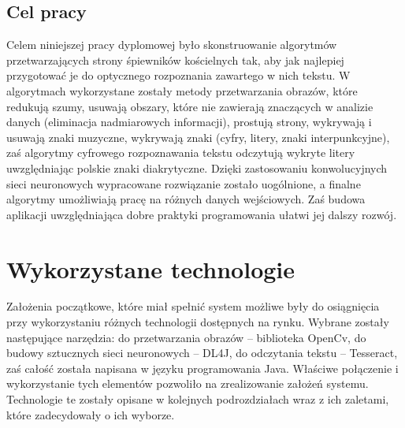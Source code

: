 \documentclass[a4paper,12pt]{article}
\newcommand\spacingIndent{2.2em}
\begin{document}
\begin{minipage}[s]{\textwidth}
		\subsection{Cel pracy}
			\hspace{\spacingIndent} Celem niniejszej pracy dyplomowej było skonstruowanie algorytmów przetwarzających strony śpiewników kościelnych tak, 
				aby jak najlepiej przygotować je do optycznego rozpoznania zawartego w nich tekstu. W algorytmach wykorzystane zostały metody przetwarzania obrazów, 
				które redukują szumy, usuwają obszary, które nie zawierają znaczących w analizie danych (eliminacja nadmiarowych informacji), 
				prostują strony, wykrywają i usuwają znaki muzyczne, wykrywają znaki (cyfry, litery, znaki interpunkcyjne), 
				zaś algorytmy cyfrowego rozpoznawania tekstu odczytują wykryte litery uwzględniając polskie znaki diakrytyczne. 
				Dzięki zastosowaniu konwolucyjnych sieci neuronowych wypracowane rozwiązanie zostało uogólnione, a \nopagebreak finalne algorytmy umożliwiają pracę 
				na różnych danych wejściowych. Zaś budowa aplikacji uwzględniająca dobre praktyki programowania ułatwi jej dalszy rozwój.
				
		\end{minipage}
				
	\newpage 

	\section{Wykorzystane technologie}
	    \hspace{\spacingIndent} Założenia początkowe, które miał spełnić system możliwe były do osiągnięcia przy wykorzystaniu różnych technologii dostępnych na rynku. Wybrane zostały następujące narzędzia: do przetwarzania obrazów -- biblioteka OpenCv, do budowy sztucznych sieci neuronowych -- DL4J, do odczytania tekstu -- Tesseract, zaś całość została napisana w języku programowania Java. Właściwe połączenie i wykorzystanie tych elementów pozwoliło na zrealizowanie założeń systemu. Technologie te zostały opisane w kolejnych podrozdziałach wraz z ich zaletami, które zadecydowały o ich wyborze.
	    
\end{document}
